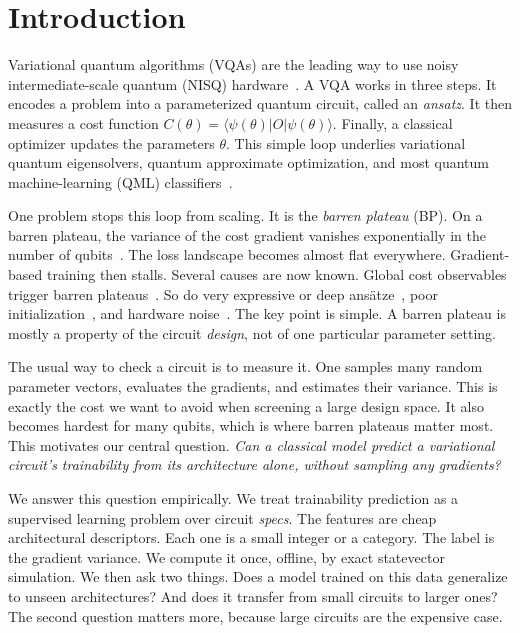 \documentclass[12pt]{iopart}
\begin{document}
\section{Introduction}

Variational quantum algorithms (VQAs) are the leading way to use noisy
intermediate-scale quantum (NISQ) hardware~\cite{cerezo2021vqa}. A VQA works in
three steps. It encodes a problem into a parameterized quantum circuit, called an
\emph{ansatz}. It then measures a cost function
$C(\theta)=\langle\psi(\theta)|O|\psi(\theta)\rangle$. Finally, a classical
optimizer updates the parameters $\theta$. This simple loop underlies variational
quantum eigensolvers, quantum approximate optimization, and most quantum
machine-learning (QML) classifiers~\cite{havlicek2019supervised,
farhi2018classification,schuld2020circuit}.

One problem stops this loop from scaling. It is the \emph{barren plateau} (BP).
On a barren plateau, the variance of the cost gradient vanishes exponentially in
the number of qubits~\cite{mcclean2018barren,larocca2025barren}. The loss
landscape becomes almost flat everywhere. Gradient-based training then stalls.
Several causes are now known. Global cost observables trigger barren
plateaus~\cite{cerezo2021cost}. So do very expressive or deep
ans\"atze~\cite{holmes2022expressibility}, poor
initialization~\cite{grant2019initialization}, and hardware
noise~\cite{wang2021noise}. The key point is simple. A barren plateau is mostly a
property of the circuit \emph{design}, not of one particular parameter setting.

The usual way to check a circuit is to measure it. One samples many random
parameter vectors, evaluates the gradients, and estimates their variance. This is
exactly the cost we want to avoid when screening a large design space. It also
becomes hardest for many qubits, which is where barren plateaus matter most. This
motivates our central question. \emph{Can a classical model predict a variational
circuit's trainability from its architecture alone, without sampling any
gradients?}

We answer this question empirically. We treat trainability prediction as a
supervised learning problem over circuit \emph{specs}. The features are cheap
architectural descriptors. Each one is a small integer or a category. The label
is the gradient variance. We compute it once, offline, by exact statevector
simulation. We then ask two things. Does a model trained on this data generalize
to unseen architectures? And does it transfer from small circuits to larger ones?
The second question matters more, because large circuits are the expensive case.
\end{document}
